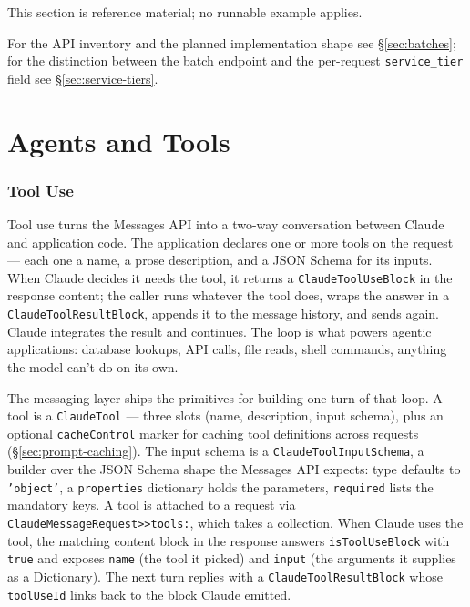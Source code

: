 \documentclass[a4paper,10pt,fleqn]{article}
\begin{document}
This section is reference material; no runnable example applies.

For the API inventory and the planned implementation shape see
§\ref{sec:batches}; for the distinction between the batch endpoint
and the per-request \texttt{service\_tier} field see
§\ref{sec:service-tiers}.

\medskip
\begin{sloppypar}
\end{sloppypar}


\part{Agents and Tools}

\section{Tool Use}
\label{sec:tool-use}

Tool use turns the Messages API into a two-way conversation between
Claude and application code.  The application declares one or more
tools on the request --- each one a name, a prose description, and a
JSON Schema for its inputs.  When Claude decides it needs the tool,
it returns a \texttt{ClaudeToolUseBlock} in the response content;
the caller runs whatever the tool does, wraps the answer in a
\texttt{ClaudeToolResultBlock}, appends it to the message history,
and sends again.  Claude integrates the result and continues.  The
loop is what powers agentic applications: database lookups, API
calls, file reads, shell commands, anything the model can't do on
its own.

The messaging layer ships the primitives for building one turn of
that loop.  A tool is a \texttt{ClaudeTool} --- three slots (name,
description, input schema), plus an optional \texttt{cacheControl}
marker for caching tool definitions across requests
(\S\ref{sec:prompt-caching}).  The input schema is a
\texttt{ClaudeToolInputSchema}, a builder over the JSON Schema
shape the Messages API expects: type defaults to \texttt{'object'},
a \texttt{properties} dictionary holds the parameters,
\texttt{required} lists the mandatory keys.  A tool is attached to a
request via \texttt{ClaudeMessageRequest>>tools:}, which takes a
collection.  When Claude uses the tool, the matching content block
in the response answers \texttt{isToolUseBlock} with \texttt{true}
and exposes \texttt{name} (the tool it picked) and \texttt{input}
(the arguments it supplies as a Dictionary).  The next turn replies
with a \texttt{ClaudeToolResultBlock} whose \texttt{toolUseId} links
back to the block Claude emitted.
\end{document}

